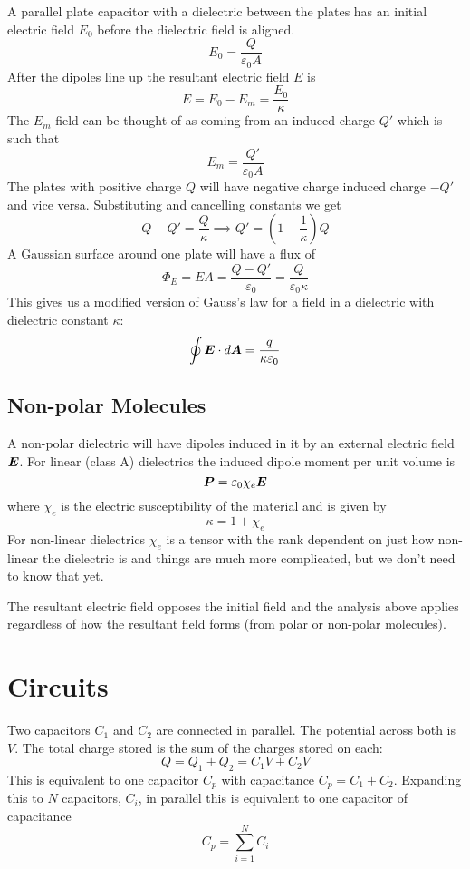 \documentclass{article}
\begin{document}
    A parallel plate capacitor with a dielectric between the plates has an initial electric field \(E_0\) before the dielectric field is aligned.
    \[E_0 = \frac{Q}{\varepsilon_0 A}\]
    After the dipoles line up the resultant electric field \(E\) is
    \[E = E_0 - E_m = \frac{E_0}{\kappa}\]
    The \(E_m\) field can be thought of as coming from an induced charge \(Q'\) which is such that
    \[E_m = \frac{Q'}{\varepsilon_0 A}\]
    The plates with positive charge \(Q\) will have negative charge induced charge \(-Q'\) and vice versa.
    Substituting and cancelling constants we get
    \[Q - Q' = \frac{Q}{\kappa}\implies Q' = \left(1 - \frac{1}{\kappa}\right)Q\]
    A Gaussian surface around one plate will have a flux of
    \[\Phi_E = EA = \frac{Q - Q'}{\varepsilon_0} = \frac{Q}{\varepsilon_0\kappa}\]
    This gives us a modified version of Gauss's law for a field in a dielectric with dielectric constant \(\kappa\):
    \[\oint \bm{E}\cdot d\bm{A} = \frac{q}{\kappa\varepsilon_0}\]
    
    \subsection{Non-polar Molecules}
    A non-polar dielectric will have dipoles induced in it by an external electric field \(\bm{E}\).
    For linear (class A) dielectrics the induced dipole moment per unit volume is
    \[\bm{P} = \varepsilon_0\chi_e\bm{E}\]
    where \(\chi_e\) is the electric susceptibility of the material and is given by
    \[\kappa = 1 + \chi_e\]
    For non-linear dielectrics \(\chi_e\) is a tensor with the rank dependent on just how non-linear the dielectric is and things are much more complicated, but we don't need to know that yet.
    
    The resultant electric field opposes the initial field and the analysis above applies regardless of how the resultant field forms (from polar or non-polar molecules).
    
    \section{Circuits}
    Two capacitors \(C_1\) and \(C_2\) are connected in parallel.
    The potential across both is \(V\).
    The total charge stored is the sum of the charges stored on each:
    \[Q = Q_1 + Q_2 = C_1V + C_2V\]
    This is equivalent to one capacitor \(C_p\) with capacitance \(C_p = C_1 + C_2\).
    Expanding this to \(N\) capacitors, \(C_i\), in parallel this is equivalent to one capacitor of capacitance
    \[C_p = \sum_{i=1}^NC_i\]
    
\end{document}
